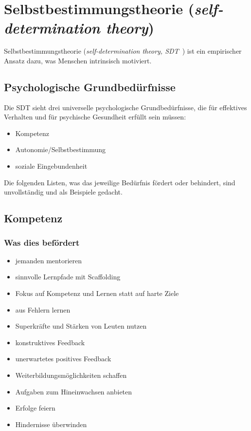 \section{Selbstbestimmungstheorie (\emph{self-determination theory})}
\label{sdt}

Selbstbestimmungstheorie (\emph{self-determination theory, SDT}~\cite{self-determiniation-theory}) ist ein empirischer Ansatz dazu, was Menschen intrinsisch motiviert.

\subsection{Psychologische Grundbedürfnisse}

Die SDT sieht drei universelle psychologische Grundbedürfnisse, die für effektives Verhalten und für psychische Gesundheit erfüllt sein müssen:

\begin{itemize}
    \item Kompetenz
    \item Autonomie/Selbstbestimmung
    \item soziale Eingebundenheit
\end{itemize}

Die folgenden Listen, was das jeweilige Bedürfnis fördert oder behindert, sind unvollständig und als Beispiele gedacht.

\subsection{Kompetenz}

\subsubsection{Was dies befördert}

\begin{itemize}
    \item jemanden mentorieren
    \item sinnvolle Lernpfade mit \glqq Scaffolding\grqq
    \item Fokus auf Kompetenz und Lernen statt auf harte Ziele
    \item aus Fehlern lernen
    \item Superkräfte und Stärken von Leuten nutzen
    \item konstruktives Feedback
    \item unerwartetes positives Feedback
    \item Weiterbildungsmöglichkeiten schaffen
    \item Aufgaben zum Hineinwachsen anbieten
    \item Erfolge feiern
    \item Hindernisse überwinden
\end{itemize}

